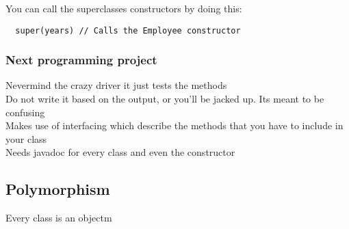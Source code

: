\documentclass{article}
\begin{document}
You can call the superclasses constructors by doing this:

\begin{lstlisting}
  super(years) // Calls the Employee constructor 
\end{lstlisting}

\subsubsection{Next programming project}
Nevermind the crazy driver it just tests the methods\\
Do not write it based on the output, or you'll be jacked up. Its meant to be confusing\\
Makes use of interfacing which describe the methods that you have to include in your class\\
Needs javadoc for every class and even the constructor 

\subsection{Polymorphism}
Every class is an objectm
\end{document}
